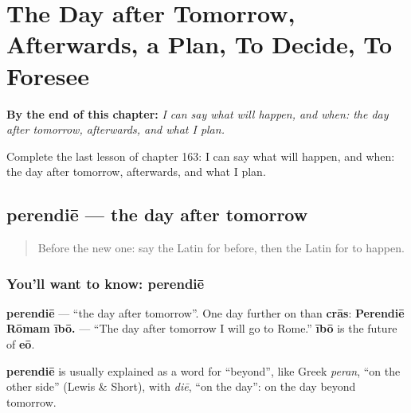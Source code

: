 
\chapter{The Day after Tomorrow, Afterwards, a Plan, To Decide, To Foresee}
\label{ch:la-the-day-after-tomorrow-afterwards-a-plan-to-decide-to-foresee}

\begin{chapteropening}
\textbf{By the end of this chapter:} \emph{I can say what will happen, and when: the day after tomorrow, afterwards, and what I plan.}

Complete the last lesson of chapter 163: I can say what will happen, and when: the day after tomorrow, afterwards, and what I plan.
\end{chapteropening}

\section[perendiē]{perendiē — the day after tomorrow}

\label{lesson:LA-C163-perendie}



\begin{quote}
Before the new one: say the Latin for before, then the Latin for to happen.
\end{quote}

\subsection*{You'll want to know: perendiē}
\textbf{perendiē} — \textquotedblleft{}the day after tomorrow\textquotedblright{}. One day further on than \textbf{crās}: \textbf{Perendiē Rōmam ībō.} — \textquotedblleft{}The day after tomorrow I will go to Rome.\textquotedblright{} \textbf{ībō} is the future of \textbf{eō}.

\begin{cousinweb}
\textbf{perendiē} is usually explained as a word for \textquotedblleft{}beyond\textquotedblright{}, like Greek \emph{peran}, \textquotedblleft{}on the other side\textquotedblright{} (Lewis \& Short), with \emph{diē}, \textquotedblleft{}on the day\textquotedblright{}: on the day beyond tomorrow.
\end{cousinweb}

